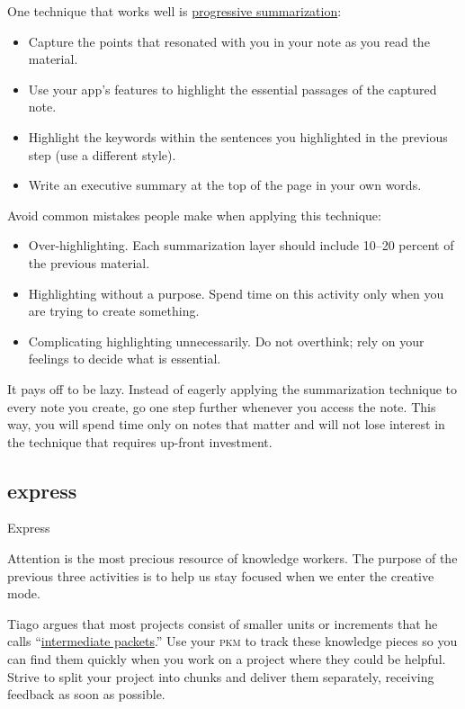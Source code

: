 \documentclass{article}
\begin{document}
One technique that works well is \href{https://fortelabs.com/blog/progressive-summarization-a-practical-technique-for-designing-discoverable-notes/}{progressive summarization}:
\begin{itemize}
  \item Capture the points that resonated with you in your note as you read the material.
  \item Use your app's features to highlight the essential passages of the captured note.
  \item Highlight the keywords within the sentences you highlighted in the previous step (use a different style).
  \item Write an executive summary at the top of the page in your own words.
\end{itemize}

Avoid common mistakes people make when applying this technique:
\begin{itemize}
  \item 
    Over-highlighting.
    Each summarization layer should include 10--20 percent of the previous material.
  \item 
    Highlighting without a purpose.
    Spend time on this activity only when you are trying to create something.
  \item 
    Complicating highlighting unnecessarily.
    Do not overthink; rely on your feelings to decide what is essential.
\end{itemize}

It pays off to be lazy.
Instead of eagerly applying the summarization technique to every note you create, go one step further whenever you access the note.
This way, you will spend time only on notes that matter and will not lose interest in the technique that requires up-front investment.

\subsection{express}{Express}

Attention is the most precious resource of knowledge workers.
The purpose of the previous three activities is to help us stay focused when we enter the creative mode.

Tiago argues that most projects consist of smaller units or increments that he calls ``\href{https://fortelabs.com/blog/just-in-time-pm-4-intermediate-packets/}{intermediate packets}.''
Use your \textsc{pkm} to track these knowledge pieces so you can find them quickly when you work on a project where they could be helpful.
Strive to split your project into chunks and deliver them separately, receiving feedback as soon as possible.
\end{document}
